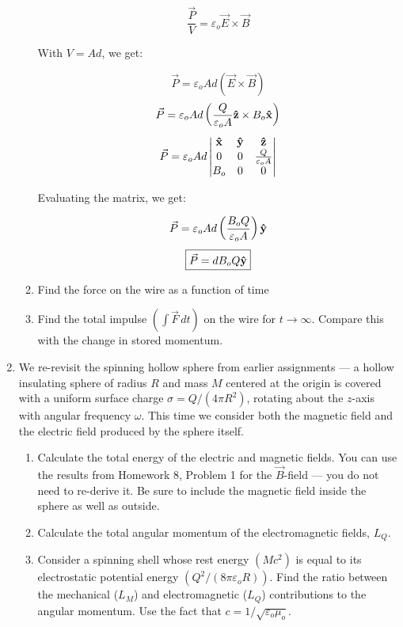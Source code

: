 \begin{enumerate}
\begin{enumerate}
        $$\frac{\vec{P}}{V}=\varepsilon_o\vec{E}\times\vec{B}$$

        With $V=Ad$, we get:

        $$\vec{P}=\varepsilon_oAd\left(\vec{E}\times\vec{B}\right)$$
        $$\vec{P}=\varepsilon_oAd\left(\frac{Q}{\varepsilon_o A}\bold{\hat{z}}\times B_o\bold{\hat{x}}\right)$$
        $$\vec{P}=\varepsilon_oAd\left|\begin{matrix} \bold{\hat{x}} & \bold{\hat{y}} & \bold{\hat{z}}\\ 0 & 0 & \frac{Q}{\varepsilon_o A}\\ B_o & 0 & 0\\ \end{matrix}\right|$$

        Evaluating the matrix, we get:

        $$\vec{P}=\varepsilon_oAd\left( \frac{B_oQ}{\varepsilon_o A} \right)\bold{\hat{y}}$$
        $$\boxed{\vec{P}=dB_oQ\bold{\hat{y}}}$$

      \item Find the force on the wire as a function of time

      \item Find the total impulse $\left( \int\vec{F}\,dt \right)$ on the wire for $t\to\infty$. Compare this with the change in stored momentum.

    \end{enumerate}

  \item We re-revisit the spinning hollow sphere from earlier assignments — a hollow insulating sphere of radius $R$ and mass $M$ centered at the origin is covered with a uniform surface charge $\sigma=Q/(4\pi R^2)$, rotating about the $z$-axis with angular frequency $\omega$. This time we consider both the magnetic field and the electric field produced by the sphere itself.

    \begin{enumerate}

      \item Calculate the total energy of the electric and magnetic fields. You can use the results from Homework 8, Problem 1 for the $\vec{B}$-field — you do not need to re-derive it.  Be sure to include the magnetic field inside the sphere as well as outside.

      \item Calculate the total angular momentum of the electromagnetic fields, $L_Q$.

      \item Consider a spinning shell whose rest energy $(Mc^2)$ is equal to its electrostatic potential energy $(Q^2/(8\pi\varepsilon_o R))$. Find the ratio between the mechanical ($L_M$) and electromagnetic ($L_Q$) contributions to the angular momentum. Use the fact that $c=1/\sqrt{\varepsilon_o\mu_o}$.

    \end{enumerate}

\end{enumerate}



